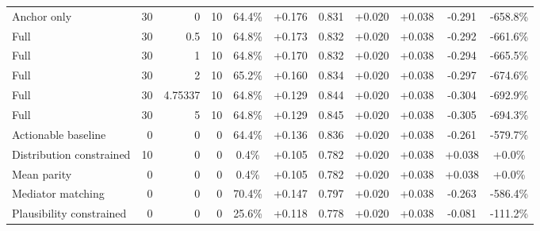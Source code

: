 \begin{table}[htbp]
\begin{tabular}{lrrrccccccc}
Anchor only & 30 & 0 & 10 & 64.4\% & +0.176 & 0.831 & +0.020 & +0.038 & -0.291 & -658.8\% \\
Full & 30 & 0.5 & 10 & 64.8\% & +0.173 & 0.832 & +0.020 & +0.038 & -0.292 & -661.6\% \\
Full & 30 & 1 & 10 & 64.8\% & +0.170 & 0.832 & +0.020 & +0.038 & -0.294 & -665.5\% \\
Full & 30 & 2 & 10 & 65.2\% & +0.160 & 0.834 & +0.020 & +0.038 & -0.297 & -674.6\% \\
Full & 30 & 4.75337 & 10 & 64.8\% & +0.129 & 0.844 & +0.020 & +0.038 & -0.304 & -692.9\% \\
Full & 30 & 5 & 10 & 64.8\% & +0.129 & 0.845 & +0.020 & +0.038 & -0.305 & -694.3\% \\
Actionable baseline & 0 & 0 & 0 & 64.4\% & +0.136 & 0.836 & +0.020 & +0.038 & -0.261 & -579.7\% \\
Distribution constrained & 10 & 0 & 0 & 0.4\% & +0.105 & 0.782 & +0.020 & +0.038 & +0.038 & +0.0\% \\
Mean parity & 0 & 0 & 0 & 0.4\% & +0.105 & 0.782 & +0.020 & +0.038 & +0.038 & +0.0\% \\
Mediator matching & 0 & 0 & 0 & 70.4\% & +0.147 & 0.797 & +0.020 & +0.038 & -0.263 & -586.4\% \\
Plausibility constrained & 0 & 0 & 0 & 25.6\% & +0.118 & 0.778 & +0.020 & +0.038 & -0.081 & -111.2\% \\
\bottomrule
\end{tabular}
\end{table}